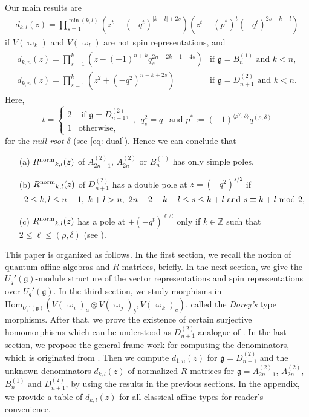 \documentclass[11pt, leqno]{amsart}
\theoremstyle{definition}
\numberwithin{equation}{section}
\begin{document}
Our main results are
\begin{align*}
 d_{k,l}(z) =  \prod_{s=1}^{\min(k,l)} (z^t-(-q^t)^{|k-l|+2s})(z^t-(p^*)^t(-q^t)^{2s-k-l})
\end{align*}
if $V({\varpi}_k)$ and $V({\varpi}_l)$ are not spin representations, and
\begin{align*}
\begin{array}{ll}
   d_{k,n}(z) = \prod_{s=1}^{k}(z-(-1)^{n+k}q_s^{2n-2k-1+4s}) & \text{if } {\mathfrak g}=B^{(1)}_{n} \text{ and } k < n, \\
   d_{k,n}(z)=\prod_{s=1}^{k}(z^2+(-q^{2})^{n-k+2s}) & \text{if } {\mathfrak g}=D^{(2)}_{n+1} \text{ and } k < n. \end{array}
\end{align*}
Here,
$$t= \begin{cases} 2 & \text{ if } {\mathfrak g}=D^{(2)}_{n+1}, \\ 1 & \text{otherwise}, \end{cases}, \ \ q_s^2=q \ \ \text{ and }
p^* {\mathbin{:=}} (-1)^{\langle \rho^\vee ,\delta \rangle}q^{(\rho,\delta)}  $$
for the {\it null root} $\delta$ (see \eqref{eq: dual}).
Hence we can conclude that
\begin{enumerate}
\item[({\rm a})] ${R^{\rm{norm}}}_{k,l}(z)$ of $A_{2n-1}^{(2)}$, $A_{2n}^{(2)}$ or $B_{n}^{(1)}$ has only simple poles,
\item[({\rm b})] ${R^{\rm{norm}}}_{k,l}(z)$ of $D_{n+1}^{(2)}$ has a double pole at $z={(-q^2)}^{s/2}$ if
$$ 2 \le k,l \le n-1, \ k+l > n, \ 2n+2-k-l \le s \le k+l \text{ and } s \equiv k+l \ {\rm mod} \ 2,$$
\item[({\rm c})] ${R^{\rm{norm}}}_{k,l}(z)$ has a pole at $\pm(-q^t)^{\ell/t}$ only if $k \in {\mathbb Z}$ such that $2 \le \ell \le (\rho,\delta)$ (see \cite{FM}).
\end{enumerate}

This paper is organized as follows. In the first section, we recall
the notion of quantum affine algebras and $R$-matrices, briefly. In
the next section, we give the $U_q'({\mathfrak g})$-module structure of the vector
representations and spin representations over $U_q'({\mathfrak g})$. In
the third section, we study morphisms in
${\mathrm{Hom}}_{U_q'({\mathfrak g})}(V({\varpi}_i)_a{\mathop\otimes} V({\varpi}_j)_b,V({\varpi}_k)_c)$, called the {\it Dorey's} type morphisms. After that, we prove the existence of certain surjective homomorphisms which can be understood
as $D^{(2)}_{n+1}$-analogue of \cite[Lemma A.3.2]{KKK13b}. In the last section, we propose the general frame work for
computing the denominators, which is originated from \cite[Appendix A]{KKK13b}.
Then we compute $d_{1,n}(z)$ for ${\mathfrak g}=D^{(2)}_{n+1}$ and the unknown denominators $d_{k,l}(z)$ of normalized $R$-matrices
for ${\mathfrak g}=A^{(2)}_{2n-1}$, $A^{(2)}_{2n}$, $B^{(1)}_{n}$ and $D^{(2)}_{n+1}$,
by using the results in the previous sections. In the appendix, we provide a
table of $d_{k,l}(z)$ for all classical affine types for reader's
convenience.
\end{document}
